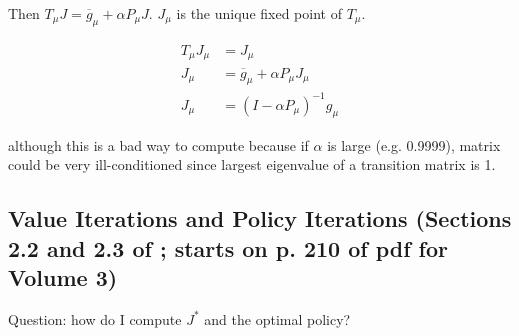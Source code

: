 Then \(T_\mu J = \overline{g}_\mu + \alpha P_\mu J\). \(J_\mu\) is the unique fixed point of \(T_\mu\). 

\begin{align*}
T_\mu J_\mu &  = J_\mu
\\ J_\mu & = \overline{g}_\mu + \alpha P_\mu J_\mu
\\ J_\mu & = (I - \alpha  P_\mu)^{-1} g_\mu
\end{align*} 

although this is a bad way to compute because if \(\alpha\) is large (e.g. 0.9999), matrix could be very ill-conditioned since largest eigenvalue of a transition matrix is 1.

\subsection{Value Iterations and Policy Iterations (Sections 2.2 and 2.3 of \citet{v2_bertsekas2012dynamic}; starts on p. 210 of pdf for Volume 3)}

Question: how do I compute \(J^*\) and the optimal policy?

